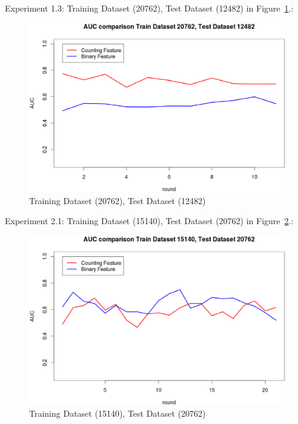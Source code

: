 \documentclass{sig-alternate}
\begin{document}
Experiment 1.3: Training Dataset  (20762), Test Dataset  (12482) in Figure~\ref{fig:fig2}.:
\begin{figure}[t]
\centering
\includegraphics[width=\columnwidth]{20762_12482.eps}
\caption{ Training Dataset  (20762), Test Dataset  (12482)}
\label{fig:fig2}
\end{figure}

Experiment 2.1: Training Dataset  (15140), Test Dataset  (20762) in Figure~\ref{fig:fig3}.:
\begin{figure}[h]
\centering
\includegraphics[width=\columnwidth]{15140_20762.eps}
\caption{Training Dataset  (15140), Test Dataset  (20762)}
\label{fig:fig3}
\end{figure}
\end{document}
